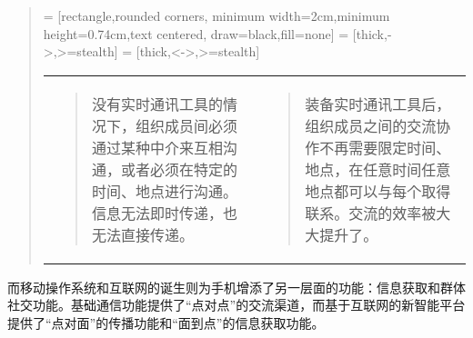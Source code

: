             \begin{quotation}
                 = [rectangle,rounded corners, minimum width=2cm,minimum height=0.74cm,text centered, draw=black,fill=none]
                 = [thick,->,>=stealth]
                 = [thick,<->,>=stealth]

                \noindent\begin{tabularx}{\linewidth}{AA}
                    \begin{quotation}
                        没有实时通讯工具的情况下，组织成员间必须通过某种中介来互相沟通，或者必须在特定的时间、地点进行沟通。信息无法即时传递，也无法直接传递。
                    \end{quotation}
                    &
                    \begin{quotation}
                        装备实时通讯工具后，组织成员之间的交流协作不再需要限定时间、地点，在任意时间任意地点都可以与每个取得联系。交流的效率被大大提升了。
                    \end{quotation}
                    \\
                \end{tabularx}
            \end{quotation}
            
            而移动操作系统和互联网的诞生则为手机增添了另一层面的功能：信息获取和群体社交功能。基础通信功能提供了“点对点”的交流渠道，而基于互联网的新智能平台提供了“点对面”的传播功能和“面到点”的信息获取功能。
            
